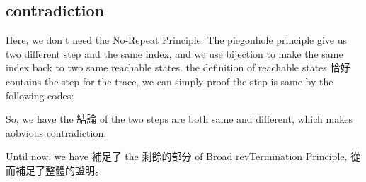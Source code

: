 \subsection{ contradiction }
Here, we don't need the No-Repeat Principle.  
The piegonhole principle give us two different step and the same index, and we use bijection to make the same index back to two same reachable states.
the definition of reachable states 恰好 contains the step for the trace, we can simply proof the step is same by the following codes:


So, we have the 結論 of the two steps are both same and different, which makes aobvious contradiction.

Until now, we have 補足了 the 剩餘的部分 of Broad revTermination Principle, 從而補足了整體的證明。
